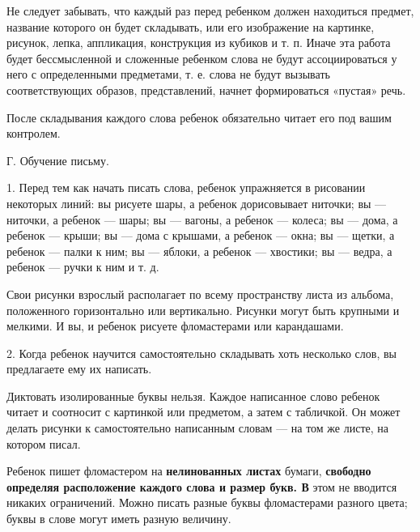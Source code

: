 \documentclass{book}
\begin{document}
Не следует забывать, что каждый раз перед ребенком должен находиться
предмет, название которого он будет складывать, или его изображение на
картинке, рисунок, лепка, аппликация, конструкция из кубиков и т. п.
Иначе эта работа будет бессмысленной и сложенные ребенком слова не будут
ассоциироваться у него с определенными предметами, т. е. слова не будут
вызывать соответствующих образов, представлений, начнет формироваться
«пустая» речь.

После складывания каждого слова ребенок обязательно читает его под вашим
контролем.

Г. Обучение письму.

1. Перед тем как начать писать слова, ребенок упражняется в рисовании
некоторых линий: вы рисуете шары, а ребенок дорисовывает ниточки; вы ---
ниточки, а ребенок --- шары; вы --- вагоны, а ребенок --- колеса; вы ---
дома, а ребенок --- крыши; вы --- дома с крышами, а ребенок --- окна; вы
--- щетки, а ребенок --- палки к ним; вы --- яблоки, а ребенок ---
хвостики; вы --- ведра, а ребенок --- ручки к ним и т. д.

Свои рисунки взрослый располагает по всему пространству листа из
альбома, положенного горизонтально или вертикально. Рисунки могут быть
крупными и мелкими. И вы, и ребенок рисуете фломастерами или
карандашами.

2. Когда ребенок научится самостоятельно складывать хоть несколько слов,
вы предлагаете ему их написать.

Диктовать изолированные буквы нельзя. Каждое написанное слово ребенок
читает и соотносит с картинкой или предметом, а затем с табличкой. Он
может делать рисунки к самостоятельно написанным словам --- на том же
листе, на котором писал.

Ребенок пишет фломастером на \textbf{нелинованных листах} бумаги,
\textbf{свободно определяя расположение каждого слова и размер букв. В}
этом не вводится никаких ограничений. Можно писать разные буквы
фломастерами разного цвета; буквы в слове могут иметь разную величину.
\end{document}
